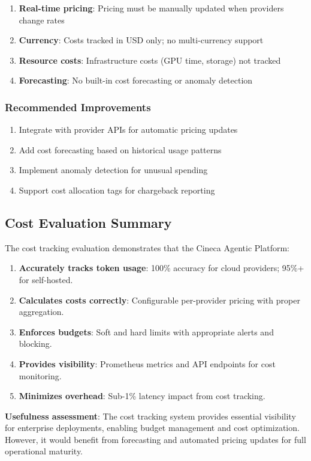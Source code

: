 \begin{enumerate}
    \item \textbf{Real-time pricing}: Pricing must be manually updated when providers change rates
    \item \textbf{Currency}: Costs tracked in USD only; no multi-currency support
    \item \textbf{Resource costs}: Infrastructure costs (GPU time, storage) not tracked
    \item \textbf{Forecasting}: No built-in cost forecasting or anomaly detection
\end{enumerate}

\subsubsection{Recommended Improvements}

\begin{enumerate}
    \item Integrate with provider APIs for automatic pricing updates
    \item Add cost forecasting based on historical usage patterns
    \item Implement anomaly detection for unusual spending
    \item Support cost allocation tags for chargeback reporting
\end{enumerate}

\subsection{Cost Evaluation Summary}

The cost tracking evaluation demonstrates that the Cineca Agentic Platform:

\begin{enumerate}
    \item \textbf{Accurately tracks token usage}: 100\% accuracy for cloud providers; 95\%+ for self-hosted.
    
    \item \textbf{Calculates costs correctly}: Configurable per-provider pricing with proper aggregation.
    
    \item \textbf{Enforces budgets}: Soft and hard limits with appropriate alerts and blocking.
    
    \item \textbf{Provides visibility}: Prometheus metrics and API endpoints for cost monitoring.
    
    \item \textbf{Minimizes overhead}: Sub-1\% latency impact from cost tracking.
\end{enumerate}

\textbf{Usefulness assessment}: The cost tracking system provides essential visibility for enterprise deployments, enabling budget management and cost optimization. However, it would benefit from forecasting and automated pricing updates for full operational maturity.

